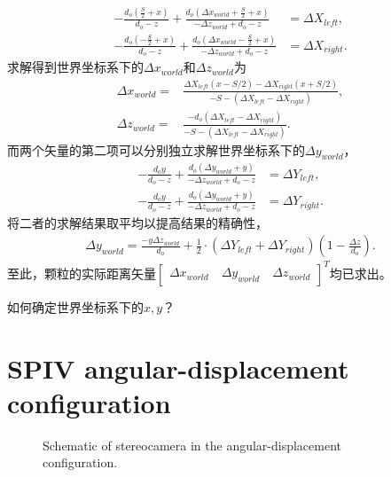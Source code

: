 \documentclass{article}
\begin{document}
\begin{align}
   - \frac{d_o  \left( \frac{S}{2} + x \right)}{d_o - z} + \frac{d_o  \left(
   \Delta x_{ {world}} + \frac{S}{2} + x \right)}{- \Delta
   z_{ {world}} + d_o - z} & = \Delta X_{ {left}},\\
   - \frac{d_o  \left( - \frac{S}{2} + x \right)}{d_o - z} + \frac{d_o 
   \left( \Delta x_{ {world}} - \frac{S}{2} + x \right)}{- \Delta
   z_{ {world}} + d_o - z} & = \Delta X_{ {right}} .
\end{align}
求解得到世界坐标系下的$\Delta x_{ {world}}$和$\Delta z_{ {world}}$为
\begin{align}
     \Delta x_{ {world}} = & \frac{\Delta X_{ {left}} (x - S / 2) -
     \Delta X_{ {right}} (x + S / 2)}{- S - (\Delta X_{ {left}} -
     \Delta X_{ {right}})},\\
     \Delta z_{ {world}} = & \frac{- d_o (\Delta X_{ {left}} - \Delta
     X_{ {right}})}{- S - (\Delta X_{ {left}} - \Delta
     X_{ {right}})} .
\end{align}
而两个矢量的第二项可以分别独立求解世界坐标系下的$\Delta y_{ {world}}$，
\begin{align}
     - \frac{d_o y}{d_o - z} + \frac{d_o  (\Delta y_{ {world}} + y)}{-
     \Delta z_{ {world}} + d_o - z}  & = \Delta Y_{ {left}},\\
     - \frac{d_o y}{d_o - z} + \frac{d_o  (\Delta y_{ {world}} + y)}{-
     \Delta z_{ {world}} + d_o - z} & = \Delta Y_{ {right}} .
 \end{align}
将二者的求解结果取平均以提高结果的精确性，
\begin{align}
\Delta y_{ {world}} = \frac{- y \Delta z_{ {world}}}{d_o} + \frac{1}{2} \cdot (\Delta Y_{ {left}} + \Delta Y_{ {right}}) \left( 1 - \frac{\Delta z}{d_o} \right) .
\end{align}
至此，颗粒的实际距离矢量$\left[\begin{array}{c} \Delta x_{ {world}} \quad \Delta y_{ {world}} \quad \Delta z_{ {world}} \end{array}\right]^T$均已求出。

如何确定世界坐标系下的$x, y$？

\section{SPIV angular-displacement configuration}

\begin{figure}[htbp]
  \centering
  \caption{Schematic of stereocamera in the angular-displacement
  configuration.}
\end{figure}
\end{document}
